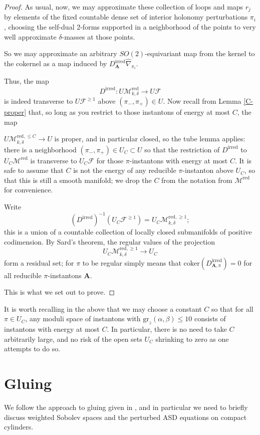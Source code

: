 \documentclass{memo-l}
\theoremstyle{definition}
\theoremstyle{remark}
\numberwithin{section}{chapter}
\numberwithin{equation}{chapter}
\begin{document}
\begin{proof}
As usual, now, we may approximate these collection of loops and maps $r_j$ by elements of the fixed countable dense set of interior holonomy perturbations $\pi_i$, choosing the self-dual 2-forms supported in a neighborhood of the points to very well approximate $\delta$-masses at those points.

So we may approximate an arbitrary $SO(2)$-equivariant map from the kernel to the cokernel as a map induced by $D^{\text{irred}}_{\mathbf{A}}\widehat{\nabla}_{\pi_i}$.

Thus, the map
$$D^{\text{irred}}: U \mathcal M^{\text{red}}_{k,\delta} \to U\mathcal F$$ is indeed transverse to $U \mathcal F^{\geq 1}$ above $(\pi_-, \pi_+) \in U$. Now recall from Lemma \ref{C-proper} that, so long as you restrict to those instantons of energy at most $C$, the map

$U \mathcal M^{\text{red},\leq C}_{k,\delta} \to U$ is proper, and in particular closed, so the tube lemma applies: there is a neighborhood $(\pi_-, \pi_+) \in U_C \subset U$ so that the restriction of $D^{\text{irred}}$ to $U_C\mathcal M^{\text{red}}$ is transverse to $U_C\mathcal F$ for those $\pi$-instantons with energy at most $C$. It is safe to assume that $C$ is not the energy of any reducible $\pi$-instanton above $U_C$, so that this is still a smooth manifold; we drop the $C$ from the notation from $\mathcal M^{\text{red}}$ for convenience.

Write $$(D^{\text{irred}})^{-1}(U_C\mathcal F^{\geq 1}) = U_C \mathcal M^{\text{red},\geq 1}_{k,\delta};$$ this is a union of a countable collection of locally closed submanifolds of positive codimension. By Sard's theorem, the regular values of the projection $$U_C \mathcal M^{\text{red},\geq 1}_{k,\delta} \to U_C$$ form a residual set; for $\pi$ to be regular simply means that $\text{coker}(D^{\text{irred}}_{\mathbf{A},\pi}) = 0$ for all reducible $\pi$-instantons $\mathbf{A}$.

This is what we set out to prove.
\end{proof}

It is worth recalling in the above that we may choose a constant $C$ so that for all $\pi \in U_C$, any moduli space of instantons with $\text{gr}_z(\alpha, \beta) \leq 10$ consists of instantons with energy at most $C$. In particular, there is no need to take $C$ arbitrarily large, and no risk of the open sets $U_C$ shrinking to zero as one attempts to do so. 

\section{Gluing}\label{sec:4d-gluing}
We follow the approach to gluing given in \cite[Chapter~19]{KMSW}, and in particular we need to briefly discuss weighted Sobolev spaces and the perturbed ASD equations on compact cylinders.
\end{document}
